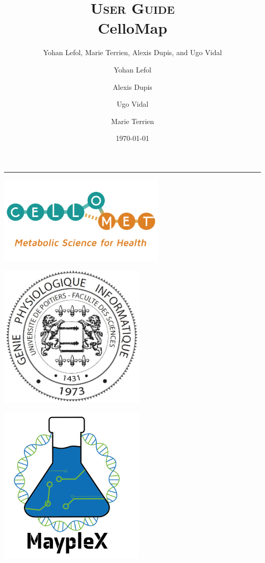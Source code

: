 \documentclass[11pt]{article}
\author{Yohan Lefol, Marie Terrien, Alexis Dupis, and Ugo Vidal}
\title{
\textsc{User Guide}\\[2.6cm]
{\LARGE \bfseries CelloMap}
}
\author{
Yohan Lefol
\and 
Alexis Dupis
\and
Ugo Vidal
\and
Marie Terrien
}
\date{
\today
}
\begin{document}
\maketitle
\hrule
\begin{center}
\includegraphics[width = 8cm]{logo-CELLOMET-a.png}
\end{center}

\begin{center}
    \begin{minipage}{0.45\textwidth}
        \includegraphics[width = 7cm]{Logo-Master-GPhy.png}
    \end{minipage}\hfill
    \begin{minipage}{0.45\textwidth}
        \includegraphics[width = 7cm]{Mayplex_Logo.png}
    \end{minipage}
\end{center}
\end{document}
